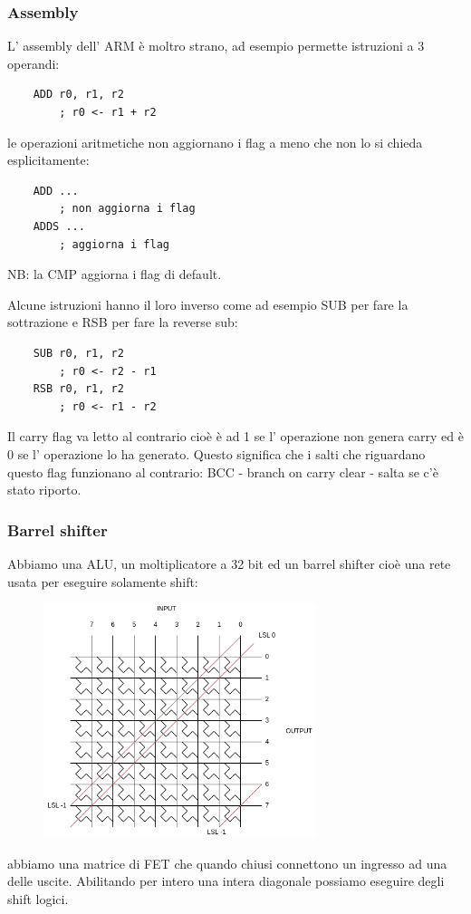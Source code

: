 \subsubsection{Assembly}
L' assembly dell' ARM è moltro strano, ad esempio permette istruzioni a 3 operandi:
\begin{verbatim}
    ADD r0, r1, r2
        ; r0 <- r1 + r2
\end{verbatim}
le operazioni aritmetiche non aggiornano i flag a meno che non lo si chieda esplicitamente:
\begin{verbatim}
    ADD ...
        ; non aggiorna i flag
    ADDS ...
        ; aggiorna i flag
\end{verbatim}
NB: la CMP aggiorna i flag di default.

Alcune istruzioni hanno il loro inverso come ad esempio SUB per fare la sottrazione e RSB per fare la reverse sub:
\begin{verbatim}
    SUB r0, r1, r2
        ; r0 <- r2 - r1
    RSB r0, r1, r2
        ; r0 <- r1 - r2
\end{verbatim}

Il carry flag va letto al contrario cioè è ad 1 se l' operazione non genera carry ed è 0 se l' operazione lo ha generato.
Questo significa che i salti che riguardano questo flag funzionano al contrario: BCC - branch on carry clear - salta se c'è stato riporto.

\subsubsection{Barrel shifter}
Abbiamo una ALU, un moltiplicatore a 32 bit ed un barrel shifter cioè una rete usata per eseguire solamente shift:
\begin{figure}[H]
    \centering
    \includegraphics[width=300px]{images/31_ARM/barrel_shifter.png}
\end{figure}
abbiamo una matrice di FET che quando chiusi connettono un ingresso ad una delle uscite.
Abilitando per intero una intera diagonale possiamo eseguire degli shift logici.

